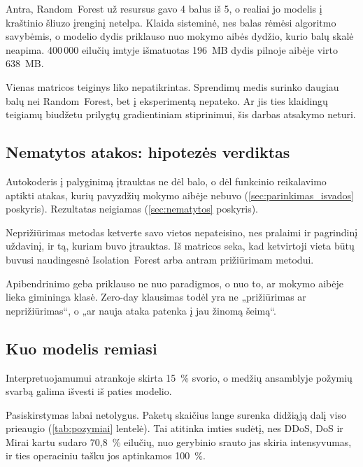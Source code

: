 Antra, Random~Forest už resursus gavo 4 balus iš 5, o realiai jo modelis
į kraštinio šliuzo įrenginį netelpa. Klaida sisteminė,
nes balas rėmėsi algoritmo savybėmis, o modelio dydis priklauso nuo
mokymo aibės dydžio, kurio balų skalė neapima. 400\,000 eilučių imtyje
išmatuotas 196~MB dydis pilnoje aibėje virto 638~MB.

Vienas matricos teiginys liko nepatikrintas. Sprendimų medis surinko
daugiau balų nei Random~Forest, bet į eksperimentą nepateko.
Ar jis ties klaidingų teigiamų biudžetu prilygtų gradientiniam
stiprinimui, šis darbas atsakymo neturi.


\subsection{Nematytos atakos: hipotezės verdiktas}
\label{sec:zero_day}

Autokoderis į palyginimą įtrauktas ne dėl balo, o dėl funkcinio
reikalavimo aptikti atakas, kurių pavyzdžių mokymo aibėje nebuvo
(\ref{sec:parinkimas_isvados} poskyris). Rezultatas neigiamas
(\ref{sec:nematytos} poskyris).

Neprižiūrimas metodas ketverte savo vietos nepateisino, nes pralaimi ir
pagrindinį uždavinį, ir tą, kuriam buvo įtrauktas. Iš matricos seka, kad
ketvirtoji vieta būtų buvusi naudingesnė Isolation~Forest arba antram
prižiūrimam metodui.

Apibendrinimo geba priklauso ne nuo paradigmos, o nuo to, ar mokymo
aibėje lieka gimininga klasė. Zero-day klausimas todėl yra ne
„prižiūrimas ar neprižiūrimas“, o „ar nauja ataka patenka į jau žinomą
šeimą“.


\subsection{Kuo modelis remiasi}
\label{sec:pozymiu_svarba}

Interpretuojamumui atrankoje skirta 15~\% svorio, o medžių ansamblyje
požymių svarbą galima išvesti iš paties modelio.

\begin{table}[htbp]
\centering
\caption{Dešimt daugiausiai informacijos prieaugio duodančių požymių.}
\label{tab:pozymiai}
\end{table}

Pasiskirstymas labai netolygus. Paketų skaičius lange surenka didžiąją
dalį viso prieaugio (\ref{tab:pozymiai} lentelė). Tai atitinka imties
sudėtį, nes DDoS, DoS ir Mirai kartu sudaro 70,8~\% eilučių, nuo
gerybinio srauto jas skiria intensyvumas, ir ties operaciniu tašku jos
aptinkamos 100~\%.

